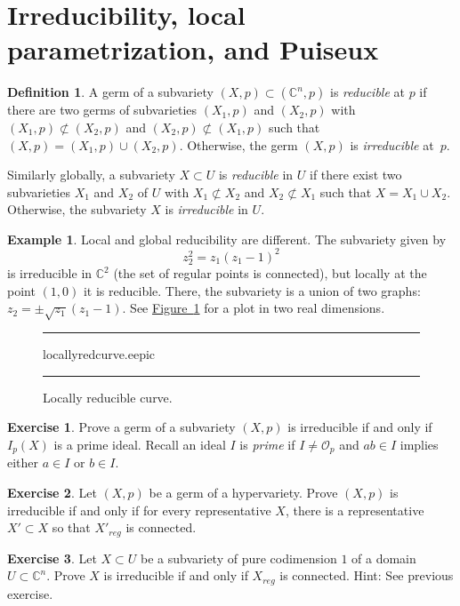 \documentclass[12pt,openany]{book}
\newcommand{\C}{{\mathbb{C}}}
\newcommand{\sO}{{\mathscr{O}}}
\newcommand{\myindex}[1]{#1\index{#1}}
\theoremstyle{plain}
\theoremstyle{remark}
\theoremstyle{definition}
\newtheorem{defn}[thm]{Definition}
\newenvironment{exbox}{%
    \def\FrameCommand{\vrule width 1pt \relax\hspace{10pt}}%
    \MakeFramed{\advance\hsize-\width\FrameRestore}%
}{%
    \endMakeFramed
}
\newenvironment{myfig}{%
\begin{figure}[h!t]
\noindent\rule{\textwidth}{0.5pt}\vspace{12pt}\par\centering}%
{\par\noindent\rule{\textwidth}{0.5pt}
\end{figure}}
\theoremstyle{exercise}
\newtheorem{exercise}{Exercise}[section]
\theoremstyle{example}
\newtheorem{example}[thm]{Example}
\newcommand{\figureref}[1]{\hyperref[#1]{Figure~\ref*{#1}}}
\begin{document}

\section{Irreducibility, local parametrization, and Puiseux}

\begin{defn}
A germ of a subvariety $(X,p) \subset (\C^n,p)$ is
\emph{\myindex{reducible}} at $p$ if there are
two germs of subvarieties $(X_1,p)$ and $(X_2,p)$ with
$(X_1,p) \not\subset (X_2,p)$ and
$(X_2,p) \not\subset (X_1,p)$ such that
$(X,p) = (X_1,p) \cup (X_2,p)$.
Otherwise, the germ $(X,p)$ is \emph{\myindex{irreducible}} at~$p$.

Similarly globally, a subvariety $X \subset U$ is
\emph{reducible} in $U$ if there exist
two subvarieties
$X_1$ and $X_2$ of $U$ with
$X_1 \not\subset X_2$ and
$X_2 \not\subset X_1$ such that
$X = X_1 \cup X_2$.
Otherwise, the subvariety $X$ is \emph{irreducible} in $U$.
\end{defn}

\begin{example}
\pagebreak[2]
Local and global reducibility are different.
The subvariety given by
\begin{equation*}
z_2^2 = z_1{(z_1-1)}^2
\end{equation*}
is irreducible in $\C^2$ (the set of regular points is connected), but locally
at the point
$(1,0)$ it is reducible.  There, the subvariety is
a union of two graphs: $z_2 = \pm \sqrt{z_1}(z_1-1)$.
See \figureref{fig:locallyredcurve} for a plot in two real dimensions.

\begin{myfig}
\medskip
{locallyredcurve.eepic}
\bigskip
\caption{Locally reducible curve.\label{fig:locallyredcurve}}
\end{myfig}
\end{example}

\begin{exbox}
\begin{exercise}
Prove a germ of a subvariety $(X,p)$ is irreducible
if and only if $I_p(X)$ is a prime ideal.
Recall an ideal $I$ is \emph{prime}
if $I \neq \sO_p$ and
$ab \in I$ implies either $a \in I$ or $b \in I$.
\end{exercise}

\begin{exercise}
Let $(X,p)$ be a germ of a hypervariety.
Prove $(X,p)$ is irreducible if and only if
for every representative $X$, there is
a representative $X' \subset X$ so that
$X'_{\mathit{reg}}$ is connected.
\end{exercise}

\begin{exercise}
Let $X \subset U$ be a subvariety of pure codimension $1$ of a domain $U
\subset \C^n$.
Prove $X$ is irreducible if and only if $X_{\mathit{reg}}$
is connected.  Hint: See previous exercise.
\end{exercise}
\end{exbox}
\end{document}
